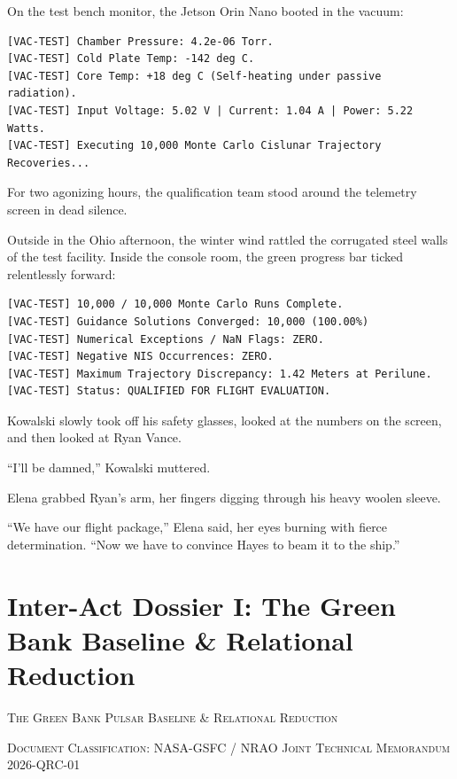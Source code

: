 \documentclass[12pt,twoside,openright]{book}
\newcommand{\sceneheader}[1]{%
  \par\vspace{1.8em}%
  {\noindent\centering\scshape\large #1\par}%
  \vspace{1.0em}%
  \noindent%
}
\begin{document}
On the test bench monitor, the Jetson Orin Nano booted in the vacuum:

\begin{lstlisting}
[VAC-TEST] Chamber Pressure: 4.2e-06 Torr.
[VAC-TEST] Cold Plate Temp: -142 deg C.
[VAC-TEST] Core Temp: +18 deg C (Self-heating under passive radiation).
[VAC-TEST] Input Voltage: 5.02 V | Current: 1.04 A | Power: 5.22 Watts.
[VAC-TEST] Executing 10,000 Monte Carlo Cislunar Trajectory Recoveries...
\end{lstlisting}

For two agonizing hours, the qualification team stood around the
telemetry screen in dead silence.

Outside in the Ohio afternoon, the winter wind rattled the corrugated
steel walls of the test facility. Inside the console room, the green
progress bar ticked relentlessly forward:

\begin{lstlisting}
[VAC-TEST] 10,000 / 10,000 Monte Carlo Runs Complete.
[VAC-TEST] Guidance Solutions Converged: 10,000 (100.00%)
[VAC-TEST] Numerical Exceptions / NaN Flags: ZERO.
[VAC-TEST] Negative NIS Occurrences: ZERO.
[VAC-TEST] Maximum Trajectory Discrepancy: 1.42 Meters at Perilune.
[VAC-TEST] Status: QUALIFIED FOR FLIGHT EVALUATION.
\end{lstlisting}

Kowalski slowly took off his safety glasses, looked at the numbers on
the screen, and then looked at Ryan Vance.

``I'll be damned,'' Kowalski muttered.

Elena grabbed Ryan's arm, her fingers digging through his heavy woolen
sleeve.

``We have our flight package,'' Elena said, her eyes burning with fierce
determination. ``Now we have to convince Hayes to beam it to the ship.''

\cleardoublepage
\chapter*{Inter-Act Dossier I: The Green Bank Baseline \& Relational Reduction}
\sceneheader{The Green Bank Pulsar Baseline \& Relational
Reduction}

\sceneheader{Document Classification: NASA-GSFC / NRAO Joint Technical
Memorandum
2026-QRC-01}
\end{document}
